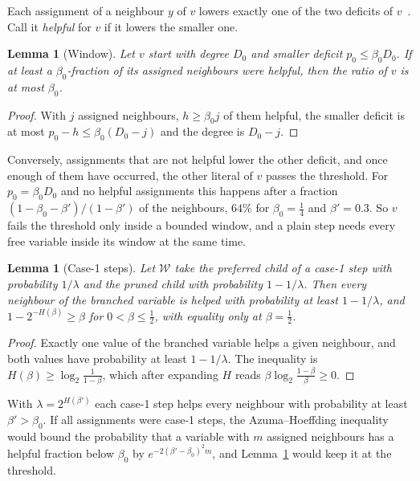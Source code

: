 \documentclass[11pt,a4paper]{article}
\newtheorem{lemma}[theorem]{Lemma}
\theoremstyle{remark}
\newcommand{\W}{\mathcal{W}}
\begin{document}
Each assignment of a neighbour $y$ of $v$ lowers exactly one of the two
deficits of $v$~\cite[Lemma~2]{N3}. Call it \emph{helpful} for $v$ if it
lowers the smaller one.

\begin{lemma}[Window]\label{lem:window}
Let $v$ start with degree $D_0$ and smaller deficit $p_0\le\beta_0D_0$. If at
least a $\beta_0$-fraction of its assigned neighbours were helpful, then the
ratio of $v$ is at most $\beta_0$.
\end{lemma}

\begin{proof}
With $j$ assigned neighbours, $h\ge\beta_0j$ of them helpful, the smaller
deficit is at most $p_0-h\le\beta_0(D_0-j)$ and the degree is $D_0-j$.
\end{proof}

Conversely, assignments that are not helpful lower the other deficit, and once
enough of them have occurred, the other literal of $v$ passes the threshold.
For $p_0=\beta_0D_0$ and no helpful assignments this happens after a fraction
$(1-\beta_0-\beta')/(1-\beta')$ of the neighbours, $64\%$ for $\beta_0=\frac14$
and $\beta'=0.3$. So $v$ fails the threshold only inside a bounded window, and
a plain step needs every free variable inside its window at the same time.

\begin{lemma}[Case-1 steps]\label{lem:coins}
Let $\W$ take the preferred child of a case-1 step with probability $1/\lambda$
and the pruned child with probability $1-1/\lambda$. Then every neighbour of
the branched variable is helped with probability at least $1-1/\lambda$, and
$1-2^{-H(\beta)}\ge\beta$ for $0<\beta\le\frac12$, with equality only at
$\beta=\frac12$.
\end{lemma}

\begin{proof}
Exactly one value of the branched variable helps a given neighbour, and both
values have probability at least $1-1/\lambda$. The inequality is
$H(\beta)\ge\log_2\frac1{1-\beta}$, which after expanding $H$ reads
$\beta\log_2\frac{1-\beta}\beta\ge0$.
\end{proof}

With $\lambda=2^{H(\beta')}$ each case-1 step helps every neighbour with
probability at least $\beta'>\beta_0$. If all assignments were case-1 steps,
the Azuma--Hoeffding inequality would bound the probability that a variable
with $m$ assigned neighbours has a helpful fraction below $\beta_0$ by
$e^{-2(\beta'-\beta_0)^2m}$, and Lemma~\ref{lem:window} would keep it at the
threshold.
\end{document}
